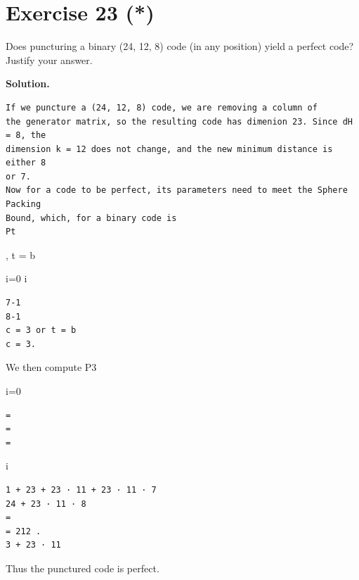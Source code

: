 \documentclass[11pt]{article}
\begin{document}
\section*{Exercise 23 (*)}
\begin{exercisebox}
Does puncturing a binary (24, 12, 8) code (in any position) yield a perfect code? Justify your answer.

\end{exercisebox}
\begin{solutionbox}
\textbf{Solution.}

\begin{Verbatim}[fontsize=\small]
If we puncture a (24, 12, 8) code, we are removing a column of
the generator matrix, so the resulting code has dimenion 23. Since dH = 8, the
dimension k = 12 does not change, and the new minimum distance is either 8
or 7.
Now for a code to be perfect, its parameters need to meet the Sphere Packing
Bound, which, for a binary code is
Pt
\end{Verbatim}
, t = b

i=0 i

\begin{Verbatim}[fontsize=\small]
7-1
8-1
c = 3 or t = b
c = 3.
\end{Verbatim}
We then compute P3

i=0

\begin{Verbatim}[fontsize=\small]
=
=
=
\end{Verbatim}
i



\begin{Verbatim}[fontsize=\small]
1 + 23 + 23 · 11 + 23 · 11 · 7
24 + 23 · 11 · 8
=
= 212 .
3 + 23 · 11
\end{Verbatim}
Thus the punctured code is perfect.

\end{solutionbox}
\end{document}
